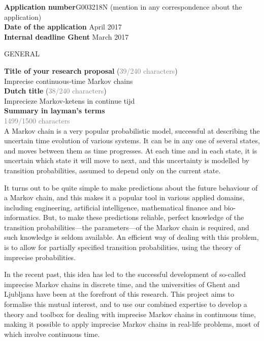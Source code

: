 \documentclass[11pt,dvipsnames,usenames,a4paper]{article}
\begin{document}
\newcommand{\todo}[1]{\textcolor{red}{\emph{#1}}}


{\bf Application number}\tab G003218N (mention in any correspondence about the application)\\
{\bf Date of the application}  April 2017 \\
{\bf Internal deadline Ghent}  March 2017 \\



\begin{shaded}\centering GENERAL \end{shaded}
\textbf{Title of your research proposal} (\textcolor{Gray}{39/240 characters})\\
Imprecise continuous-time Markov chains\\[8pt]
\textbf{Dutch title} (\textcolor{Gray}{38/240 characters})\\
Imprecieze Markov-ketens in continue tijd\\[8pt]
\textbf{Summary in layman's terms}\\
\textcolor{Gray}{1499/1500 characters}\\
A Markov chain is a very popular probabilistic model, successful at describing the uncertain time evolution of various systems. 
It can be in any one of several states, and moves between them as time progresses. 
At each time and in each state, it is uncertain which state it will move to next, and this uncertainty is modelled by transition probabilities, assumed to depend only on the current state. 

It turns out to be quite simple to make predictions about the future behaviour of a Markov chain, and this makes it a popular tool in various applied domains, including engineering, artificial intelligence, mathematical finance and bio-informatics. 
But, to make these predictions reliable, perfect knowledge of the transition probabilities---the parameters---of the Markov chain is required, and such knowledge is seldom available. 
An efficient way of dealing with this problem, is to allow for partially specified transition probabilities, using the theory of imprecise probabilities.

In the recent past, this idea has led to the successful development of so-called imprecise Markov chains in discrete time, and the universities of Ghent and Ljubljana have been at the forefront of this research. 
This project aims to formalise this mutual interest, and to use our combined expertise to develop a theory and toolbox for dealing with imprecise Markov chains in continuous time, making it possible to apply imprecise Markov chains in real-life problems, most of which involve continuous time.
\end{document}
